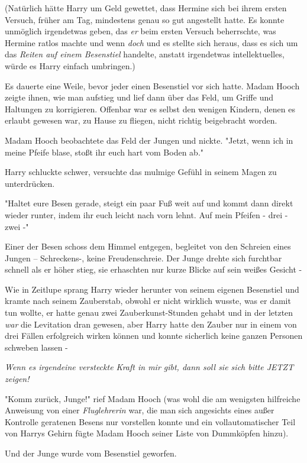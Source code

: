 {(Natürlich hätte Harry um Geld gewettet, dass Hermine sich bei ihrem ersten Versuch, früher am Tag, mindestens genau so gut angestellt hatte. Es konnte unmöglich irgendetwas geben, das \emph{er} beim ersten Versuch beherrschte, was Hermine ratlos machte und wenn \emph{doch} und es stellte sich heraus, dass es sich um das \emph{Reiten auf einem Besenstiel} handelte, anstatt irgendetwas intellektuelles, würde es Harry einfach umbringen.)

Es dauerte eine Weile, bevor jeder einen Besenstiel vor sich hatte. Madam Hooch zeigte ihnen, wie man aufstieg und lief dann über das Feld, um Griffe und Haltungen zu korrigieren. Offenbar war es selbst den wenigen Kindern, denen es erlaubt gewesen war, zu Hause zu fliegen, nicht richtig beigebracht worden.

Madam Hooch beobachtete das Feld der Jungen und nickte. "Jetzt, wenn ich in meine Pfeife blase, stoßt ihr euch hart vom Boden ab."

Harry schluckte schwer, versuchte das mulmige Gefühl in seinem Magen zu unterdrücken.

"Haltet eure Besen gerade, steigt ein paar Fuß weit auf und kommt dann direkt wieder runter, indem ihr euch leicht nach vorn lehnt. Auf mein Pfeifen - drei - zwei -"

Einer der Besen schoss dem Himmel entgegen, begleitet von den Schreien eines Jungen -- Schreckens-, keine Freudenschreie. Der Junge drehte sich furchtbar schnell als er höher stieg, sie erhaschten nur kurze Blicke auf sein weißes Gesicht -

Wie in Zeitlupe sprang Harry wieder herunter von seinem eigenen Besenstiel und kramte nach seinem Zauberstab, obwohl er nicht wirklich wusste, was er damit tun wollte, er hatte genau zwei Zauberkunst-Stunden gehabt und in der letzten \emph{war} die Levitation dran gewesen, aber Harry hatte den Zauber nur in einem von drei Fällen erfolgreich wirken können und konnte sicherlich keine ganzen Personen schweben lassen -

\emph{Wenn es irgendeine versteckte Kraft in mir gibt, dann soll sie sich bitte JETZT zeigen!}

"Komm zurück, Junge!" rief Madam Hooch (was wohl die am wenigsten hilfreiche Anweisung von einer \emph{Fluglehrerin} war, die man sich angesichts eines außer Kontrolle geratenen Besens nur vorstellen konnte und ein vollautomatischer Teil von Harrys Gehirn fügte Madam Hooch seiner Liste von Dummköpfen hinzu).

Und der Junge wurde vom Besenstiel geworfen.

}
